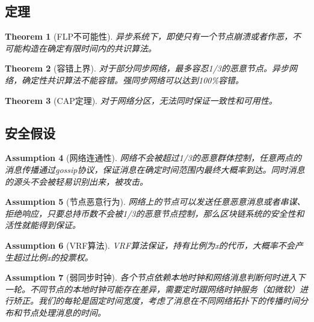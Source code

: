 \documentclass[12pt, UTF8]{article}
\newtheorem{theorem}{Theorem}[section]
\newtheorem{assumption}[theorem]{Assumption}
\begin{document}
\subsection{定理}
\begin{theorem}[FLP不可能性]
\label{FLP}
异步系统下，即使只有一个节点崩溃或者作恶，不可能构造在确定有限时间内的共识算法。
\end{theorem}

\begin{theorem}[容错上界]
\label{BFT}
对于部分同步网络，最多容忍1/3的恶意节点。异步网络，确定性共识算法不能容错。强同步网络可以达到100\%容错。
\end{theorem}

\begin{theorem}[CAP定理]
\label{CAP}
对于网络分区，无法同时保证一致性和可用性。
\end{theorem}

\subsection{安全假设}
\begin{assumption}[网络连通性]
\label{as:Network}
网络不会被超过1/3的恶意群体控制，任意两点的消息传播通过gossip协议，保证消息在确定时间范围内最终大概率到达。同时消息的源头不会被轻易识别出来，被攻击。
\end{assumption}

\begin{assumption}[节点恶意行为]
\label{as:Mnodes}
网络上的节点可以发送任意恶意消息或者串谋、拒绝响应，只要总持币数不会被1/3的恶意节点控制，那么区块链系统的安全性和活性就能得到保证。
\end{assumption}

\begin{assumption}[VRF算法]
\label{as:VRF}
VRF算法保证，持有比例为x的代币，大概率不会产生超过比例x的投票权。
\end{assumption}

\begin{assumption}[弱同步时钟]
\label{as:Wclock}
各个节点依赖本地时钟和网络消息判断何时进入下一轮。不同节点的本地时钟可能存在差异，需要定时跟网络时钟服务（如微软）进行矫正。我们的每轮是固定时间宽度，考虑了消息在不同网络拓扑下的传播时间分布和节点处理消息的时间。
\end{assumption}

\begin{comment}
\begin{assumption}[身份绑定]
通过将用户的共识权利和花费代币权利进行独立和绑定，我们保证了用户身份的切换，同时支持类似dpos的方式。
\end{assumption}
\end{comment}
\end{document}

